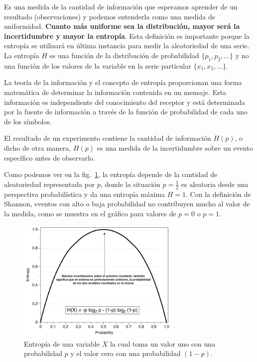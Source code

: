 \documentclass[a4paper,12pt]{article}
\begin{document}
\begin{itemize}[noitemsep, topsep=2pt]
Es una medida de la cantidad de información que esperamos aprender de un resultado (observaciones) y podemos entenderla como una medida de uniformidad. \textbf{Cuanto más uniforme sea la distribución, mayor será la incertidumbre y mayor la entropía}. Esta definición es importante porque la entropía se utilizará en última instancia para medir la aleatoriedad de una serie. La entropía $H$ es una función de la distribución de probabilidad $\{p_1, p_2, \dots \}$ y no una función de los valores de la variable en la serie particular $\{x_1, x_2, \dots\}$. 

La teoría de la información y el concepto de entropía proporcionan una forma matemática de determinar la información contenida en un mensaje. Esta información es independiente del conocimiento del receptor y está determinada por la fuente de información a través de la función de probabilidad de cada uno de los símbolos. 

El resultado de un experimento contiene la cantidad de información $H(p)$, o dicho de otra manera, $H(p)$ es una medida de la incertidumbre sobre un evento específico antes de observarlo.

Como podemos ver en la fig.~\ref{fig:entropy}, la entropía depende de la cantidad de aleatoriedad representada por $p$, donde la situación $p = \frac{1}{2}$ es aleatoria desde una perspectiva probabilística y da una entropía máxima $H=1$. Con la definición de Shannon, eventos con alto o baja probabilidad no contribuyen mucho al valor de la medida, como se muestra en el gráfico para valores de $p =0$ o $p=1$.

\end{itemize}

\begin{figure}[H]
	\begin{center}
	\includegraphics[width=0.7\textwidth]{entropy2.png}
  	\caption{Entropía de una variable $X$ la cual toma un valor uno con una probabilidad $p$ y el valor cero con una probabilidad $(1-p)$. \citep{delgado2019approximate}}
  	\label{fig:entropy}
  	\end{center}
\end{figure}
\end{document}
